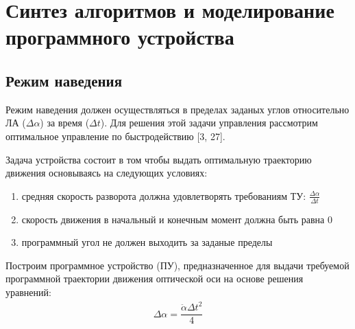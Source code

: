 \begin{comment}
\subsection{Уравнения движения привода по азимуту} \label{subsec:ch4/sect3/sub1}

Линеаризованные уравнения движения азимутального привода совместно с объектом управления запишутся [29] [30] [31] [32] [33] [34]:

\subsection{Уравнения движения привода по углу места} \label{subsec:ch4/sect3/sub2}
\end{comment}



\section{Синтез алгоритмов и моделирование программного устройства} \label{ch:ch4/sect2+}

\subsection{Режим наведения} \label{subsec:ch4/sect2/sub1}

Режим наведения должен осуществляться в пределах заданых углов относительно ЛА ($\varDelta\alpha$) за время ($\varDelta t$). Для решения этой задачи управления рассмотрим оптимальное управление по быстродействию [3, 27].

Задача устройства состоит в том чтобы выдать оптимальную траекторию движения основываясь на следующих условиях:
\begin{enumerate}
	\item средняя скорость разворота должна удовлетворять требованиям ТУ: 
	$\frac{\varDelta\alpha}{\varDelta t}$
	\item скорость движения в начальный и конечным момент должна быть равна 0
	\item программный угол не должен выходить за заданые пределы
\end{enumerate}

Построим программное устройство (ПУ), предназначенное для выдачи требуемой программной траектории движения оптической оси на основе решения уравнений:
\begin{equation}
\label{eq:p4:2+.1}
\begin{alignedat}{2}
\varDelta\alpha = \dfrac{\ddot{\alpha}{\varDelta t}^2}{4}
\end{alignedat}
\end{equation}

